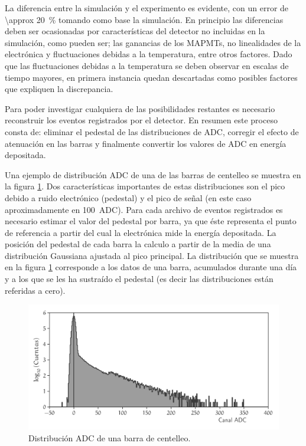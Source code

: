 La diferencia entre la simulación y el experimento es evidente, con un error de \SI{\approx 20}{\percent} tomando como base la simulación. En principio las diferencias deben ser ocasionadas por características del detector no incluidas en la simulación, como pueden ser; las ganancias de los MAPMTs, no linealidades de la electrónica y fluctuaciones debidas a la temperatura, entre otros factores. Dado que las fluctuaciones debidas a la temperatura se deben observar en escalas de tiempo mayores, en primera instancia quedan descartadas como posibles factores que expliquen la discrepancia.

Para poder investigar cualquiera de las posibilidades restantes es necesario reconstruir los eventos registrados por el detector. En resumen este proceso consta de: eliminar el pedestal de las distribuciones de ADC, corregir el efecto de atenuación en las barras y finalmente convertir los valores de ADC en energía depositada.

Una ejemplo de distribución ADC de una de las barras de centelleo se muestra en la figura \ref{fig:neutron-pedestal}. Dos características importantes de estas distribuciones son el pico debido a ruido electrónico (pedestal) y el pico de señal (en este caso aproximadamente en \SI{100}{ADC}). Para cada archivo de eventos registrados es necesario estimar el valor del pedestal por barra, ya que éste representa el punto de referencia a partir del cual la electrónica mide la energía depositada. La posición del pedestal de cada barra la calculo a partir de la media de una distribución Gaussiana ajustada al pico principal. La distribución que se muestra en la figura \ref{fig:neutron-pedestal} corresponde a los datos de una barra, acumulados durante una día y a los que se les ha sustraído el pedestal (es decir las distribuciones están referidas a cero).

\begin{figure}
        \centering
        \includegraphics[width=\textwidth]{neutron-ped.pdf}
        \caption{Distribución ADC de una barra de centelleo.}
        \label{fig:neutron-pedestal}
\end{figure}

